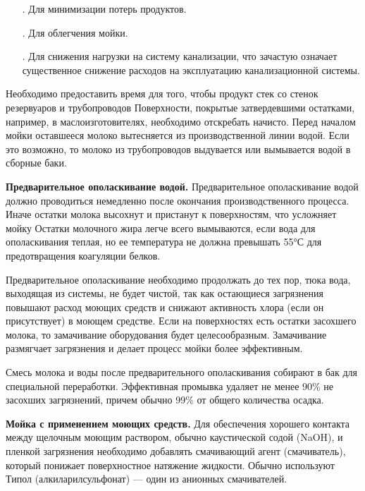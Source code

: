 {\begin{itemize}[leftmargin=2.15cm, labelwidth=0.65cm, labelsep=0.0cm]
	\item[\theitemcntr. ] Для минимизации потерь продуктов.
	\addtocounter{itemcntr}{1}
	
	\item[\theitemcntr. ] Для облегчения мойки.
	\addtocounter{itemcntr}{1}
	
	\item[\theitemcntr. ] Для снижения нагрузки на систему канализации, что зачастую означает существенное снижение расходов на эксплуатацию канализационной системы.
	\addtocounter{itemcntr}{1}
	
	\setcounter{itemcntr}{1}
\end{itemize} 

\par \redline Необходимо предоставить время для того, чтобы продукт стек со стенок резервуаров и трубопроводов Поверхности, покрытые затвердевшими остатками, например, в маслоизготовителях, необходимо отскребать начисто. Перед началом мойки оставшееся молоко вытесняется из производственной линии водой. Если это возможно, то молоко из трубопроводов выдувается или вымывается водой в сборные баки.


\par \redline \textbf{Предварительное ополаскивание водой.} Предварительное ополаскивание водой должно проводиться немедленно после окончания производственного процесса. Иначе остатки молока высохнут и пристанут к поверхностям, что усложняет мойку Остатки молочного жира легче всего вымываются, если вода для ополаскивания теплая, но ее температура не должна превышать 55°С для предотвращения коагуляции белков.

\par \redline Предварительное ополаскивание необходимо продолжать до тех пор, тюка вода, выходящая из системы, не будет чистой, так как остающиеся загрязнения повышают расход моющих средств и снижают активность хлора (если он присутствует) в моющем средстве. Если на поверхностях есть остатки засохшего молока, то замачивание оборудования будет целесообразным. Замачивание размягчает загрязнения и делает процесс мойки более эффективным.

\par \redline Смесь молока и воды после предварительного ополаскивания собирают в бак для специальной переработки. Эффективная промывка удаляет не менее 90\% не засохших загрязнений, причем обычно 99\% от общего количества осадка.

\par \redline \textbf{Мойка с применением моющих средств.} Для обеспечения хорошего контакта между щелочным моющим раствором, обычно каустической содой (NaOH), и пленкой загрязнения необходимо добавлять смачивающий агент (смачиватель), который понижает поверхностное натяжение жидкости. Обычно используют Типол (алкиларилсульфонат) — один из анионных смачивателей.

}

